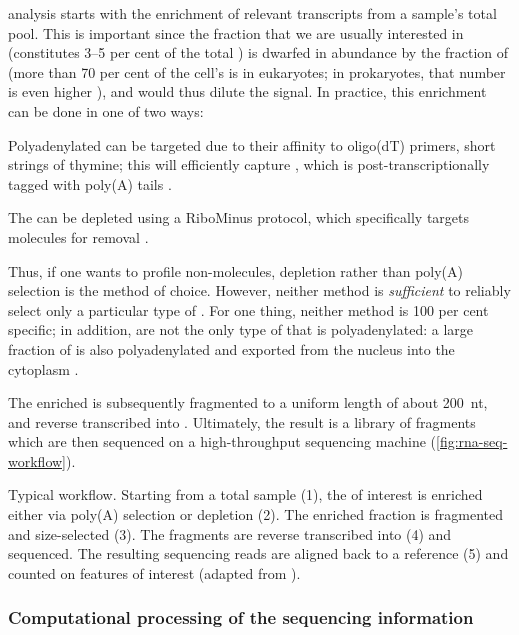 \rnaseq analysis starts with the enrichment of relevant transcripts from a
sample’s total \rna pool. This is important since the \rna fraction that we are
usually interested in (\mrna constitutes \numrange{3}{5} per cent of the total
\rna \citep{Alberts:2002}) is dwarfed in abundance by the fraction of \rrna
(more than \num{70} per cent of the cell’s \rna is \rrna in eukaryotes; in
prokaryotes, that number is even higher \citep{Sittman:1999}), and would thus
dilute the signal. In practice, this enrichment can be done in one of two ways:
\begin{enumerate*}
    \item Polyadenylated \rna can be targeted due to their affinity to oligo(dT)
        primers, short strings of thymine; this will efficiently capture \mrna,
        which is post-transcriptionally \threep tagged with poly(A)
        tails \citep{Mortazavi:2008}.
    \item The \rna can be \rrna depleted using a RiboMinus protocol, which
        specifically targets \rrna molecules for removal \citep{Cui:2010}.
\end{enumerate*}
Thus, if one wants to profile non-\mrna molecules, \rrna depletion rather than
poly(A) selection is the method of choice. However, neither method is
\emph{sufficient} to reliably select only a particular type of \rna. For one
thing, neither method is \num{100} per cent specific; in addition, \mrna[s] are
not the only type of \rna that is polyadenylated: a large fraction of \ncrna is
also polyadenylated and exported from the nucleus into the cytoplasm
\citep{Cheng:2005}.

The enriched \rna is subsequently fragmented to a uniform length of about
\SI{200}{nt}, and reverse transcribed into \cdna. Ultimately, the result is a
\cdna library of fragments which are then sequenced on a high-throughput
sequencing machine (\cref{fig:rna-seq-workflow}).

    {Typical \rnaseq workflow.}
    {Starting from a total \rna sample (\num{1}), the \rna of interest is
    enriched either via poly(A) selection or \rrna depletion (\num{2}). The
    enriched fraction is fragmented and size-selected (\num{3}). The fragments
    are reverse transcribed into \cdna (\num{4}) and sequenced. The resulting
    sequencing reads are aligned back to a reference (\num{5}) and counted on
    features of interest (adapted from \citet{Mortazavi:2008}).}

\subsubsection{Computational processing of the sequencing information}

